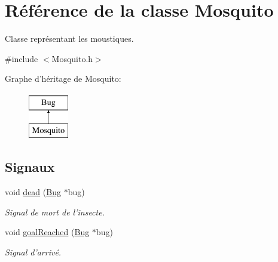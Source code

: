 \hypertarget{classMosquito}{
\section{Référence de la classe Mosquito}
\label{classMosquito}
}


Classe représentant les moustiques.  




{\ttfamily \#include $<$Mosquito.h$>$}

Graphe d'héritage de Mosquito:\begin{figure}[H]
\begin{center}
\leavevmode
\includegraphics[height=2.000000cm]{classMosquito}
\end{center}
\end{figure}
\subsection*{Signaux}
\begin{DoxyCompactItemize}
\item 
void \hyperlink{classBug_ab7379f5a0172e2d536e20f3f29915e02}{dead} (\hyperlink{classBug}{Bug} $\ast$bug)
\begin{DoxyCompactList}\small\item\em Signal de mort de l'insecte. \end{DoxyCompactList}\item 
void \hyperlink{classBug_a33f90dffa55e1dce80dc2416c75a53c8}{goalReached} (\hyperlink{classBug}{Bug} $\ast$bug)
\begin{DoxyCompactList}\small\item\em Signal d'arrivé. \end{DoxyCompactList}\end{DoxyCompactItemize}
